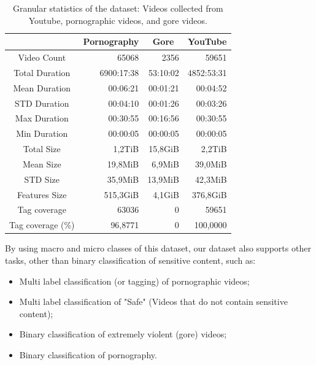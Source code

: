 \begin{table}
\centering
\caption{Granular statistics of the dataset: Videos collected from Youtube, pornographic videos, and gore videos.}
\begin{tabular}{c|r|r|r} 
\multicolumn{1}{l|}{} & \multicolumn{1}{c|}{Pornography} & \multicolumn{1}{c|}{Gore} & \multicolumn{1}{c}{YouTube}  \\ 
\hline
Video Count           & 65068                     & 2356                      & 59651                         \\ 
\hline
Total Duration        & 6900:17:38                & 53:10:02                  & 4852:53:31                    \\ 
\hline
Mean Duration         & 00:06:21                  & 00:01:21                  & 00:04:52                      \\ 
\hline
STD Duration          & 00:04:10                  & 00:01:26                  & 00:03:26                      \\ 
\hline
Max Duration          & 00:30:55                  & 00:16:56                  & 00:30:55                      \\ 
\hline
Min Duration          & 00:00:05                  & 00:00:05                  & 00:00:05                      \\ 
\hline
Total Size            & 1,2TiB                    & 15,8GiB                   & 2,2TiB                        \\ 
\hline
Mean Size             & 19,8MiB                   & 6,9MiB                    & 39,0MiB                       \\ 
\hline
STD Size              & 35,9MiB                   & 13,9MiB                   & 42,3MiB                       \\ 
\hline
Features Size         & 515,3GiB                  & 4,1GiB                    & 376,8GiB                      \\ 
\hline
Tag coverage          & 63036                     & 0                      & 59651                         \\ 
\hline
Tag coverage (\%)     & 96,8771                   & 0                  & 100,0000                       \\
\end{tabular}
\label{tab:granular-stats}
\end{table}

By using macro and micro classes of this dataset, our dataset  also supports other tasks, other than binary classification of sensitive content, such as:
\begin{itemize}
    \item Multi label classification (or tagging) of pornographic videos;
    \item Multi label classification of "Safe" (Videos that do not contain sensitive content);
    \item Binary classification of extremely violent (gore) videos;
    \item Binary classification of pornography.
\end{itemize}


